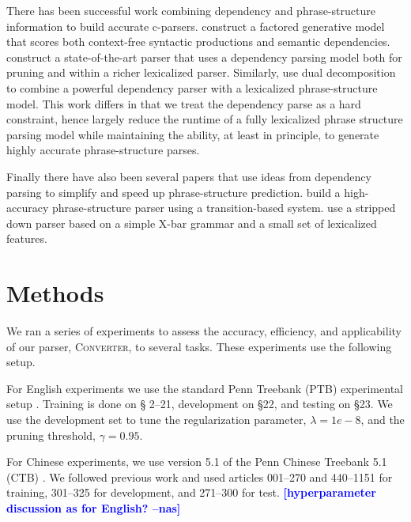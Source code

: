 \documentclass[11pt,letterpaper]{article}
\newcommand{\ParseName}{\textsc{Converter}\xspace}
\newcommand{\nascomment}[1]{\textcolor{blue}{\bf \small [#1 --nas]}}
\begin{document}
There has been successful work combining dependency and
phrase-structure information to build accurate c-parsers.
 construct a factored generative model that
scores both context-free syntactic productions and semantic
dependencies.   construct a state-of-the-art
parser that uses a dependency parsing model both for pruning and
within a richer lexicalized parser. Similarly, 
use dual decomposition to combine a powerful dependency parser with a
lexicalized phrase-structure model. This work differs in that we treat the
dependency parse as a hard constraint, hence largely reduce the
runtime of a fully lexicalized phrase structure parsing model
while maintaining the ability, at least in principle, to generate
highly accurate phrase-structure parses.




Finally there have also been several papers that use ideas from
dependency parsing to simplify and speed up phrase-structure prediction.
 build a high-accuracy phrase-structure parser
using a transition-based system.  use a stripped
down parser based on a simple X-bar grammar and a small set of lexicalized features.


\section{Methods}

We ran a series of experiments to assess the accuracy, efficiency,
and applicability of our parser, \ParseName, to several tasks. These experiments
use the following setup.  

For English experiments we use the standard Penn Treebank (PTB)
experimental setup \cite{marcus1993building}. Training is done on \S
2--21, development on \S 22, and testing on \S 23. We use the development set 
to tune the 
regularization parameter, $\lambda=1e-8$, and the pruning threshold, $\gamma=0.95$.

For Chinese experiments, we use version 5.1 of the Penn  Chinese Treebank 5.1 (CTB) \cite{xue2005penn}. We followed previous work and used
articles 001--270 and 440--1151 for training, 
301--325 for development, and 
271--300 for test. \nascomment{hyperparameter discussion as for English?}
\end{document}
